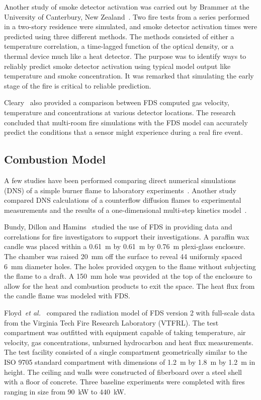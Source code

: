Another study of smoke detector  activation was carried out by Brammer at  the University  of Canterbury,  New  Zealand~\cite{Brammer:1}. Two fire
tests from  a series  performed  in a  two-story residence  were simulated, and  smoke detector  activation times were  predicted using three
different methods. The methods consisted of either a temperature correlation,  a time-lagged  function  of the  optical  density, or  a thermal
device much like a heat detector.  The purpose was to identify ways to reliably predict smoke detector activation using typical model output like
temperature and  smoke concentration. It was remarked that simulating  the  early stage  of  the  fire  is critical  to  reliable prediction.

Cleary~\cite{Cleary:1} also provided a comparison between FDS computed gas  velocity,  temperature  and  concentrations at  various  detector
locations.   The research concluded  that multi-room  fire simulations with the FDS model can accurately predict the conditions that a sensor might
experience during a real fire  event. 




\subsection{Combustion Model}

A few studies have been performed comparing direct numerical
simulations (DNS) of a simple burner flame to laboratory
experiments~\cite{Mukhopadhyay:1}. Another study compared DNS
calculations of a counterflow diffusion flames to experimental
measurements and the results of a one-dimensional multi-step kinetics
model~\cite{Hamins:NASA}.

Bundy,  Dillon and  Hamins~\cite{Dillon:1,Hamins:FPE2005}  studied the use of FDS  in providing data and correlations  for fire investigators to
support their investigations.   A paraffin  wax candle  was placed within  a  0.61~m by  0.61~m  by  0.76~m  plexi-glass enclosure.   The chamber was
raised 20~mm off the surface to reveal 44 uniformly spaced 6~mm diameter holes.   The holes provided oxygen to  the flame without subjecting the
flame to a draft.   A 150~mm hole was  provided at the top of the enclosure to allow  for the heat and combustion products to exit the space.  The
heat flux  from the candle flame was modeled with FDS. 

Floyd~{\em et al.}~\cite{Floyd:1,Floyd:6} compared the radiation model of  FDS version 2  with full-scale  data from  the Virginia  Tech Fire
Research Laboratory (VTFRL).  The  test compartment was outfitted with equipment   capable   of  taking   temperature,   air  velocity,   gas
concentrations, unburned hydrocarbon  and heat flux measurements.  The test facility consisted of  a single compartment geometrically similar to the
ISO 9705 standard compartment with dimensions of 1.2~m by 1.8~m by  1.2~m  in height.   The  ceiling  and  walls were  constructed  of fiberboard
over  a steel  shell  with  a  floor of  concrete.   Three baseline experiments  were completed with  fires ranging in  size from 90~kW  to 440~kW.

